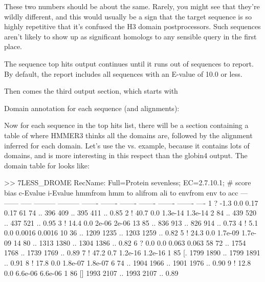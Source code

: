 These two numbers should be about the same. Rarely, you might see that
they're wildly different, and this would usually be a sign that the
target sequence is so highly repetitive that it's confused the H3
domain postprocessors. Such sequences aren't likely to show up as
significant homologs to any sensible query in the first place.

The sequence top hits output continues until it runs out of sequences
to report. By default, the report includes all sequences with an
E-value of 10.0 or less. 

Then comes the third output section, which starts with

\begin{sreoutput}
Domain annotation for each sequence (and alignments):
\end{sreoutput}

Now for each sequence in the top hits list, there will be a section 
containing a table of where HMMER3 thinks all the domains are,
followed by the alignment inferred for each domain. Let's use the
 vs.  example, because it contains lots
of domains, and is more interesting in this respect than the globin4
output.  The domain table for  looks like:

\begin{sreoutput}
>> 7LESS_DROME  RecName: Full=Protein sevenless;          EC=2.7.10.1;
   #    score  bias  c-Evalue  i-Evalue hmmfrom  hmm to    alifrom  ali to    envfrom  env to     acc
 ---   ------ ----- --------- --------- ------- -------    ------- -------    ------- -------    ----
   1 ?   -1.3   0.0      0.17      0.17      61      74 ..     396     409 ..     395     411 .. 0.85
   2 !   40.7   0.0   1.3e-14   1.3e-14       2      84 ..     439     520 ..     437     521 .. 0.95
   3 !   14.4   0.0     2e-06     2e-06      13      85 ..     836     913 ..     826     914 .. 0.73
   4 !    5.1   0.0    0.0016    0.0016      10      36 ..    1209    1235 ..    1203    1259 .. 0.82
   5 !   24.3   0.0   1.7e-09   1.7e-09      14      80 ..    1313    1380 ..    1304    1386 .. 0.82
   6 ?    0.0   0.0     0.063     0.063      58      72 ..    1754    1768 ..    1739    1769 .. 0.89
   7 !   47.2   0.7   1.2e-16   1.2e-16       1      85 [.    1799    1890 ..    1799    1891 .. 0.91
   8 !   17.8   0.0   1.8e-07   1.8e-07       6      74 ..    1904    1966 ..    1901    1976 .. 0.90
   9 !   12.8   0.0   6.6e-06   6.6e-06       1      86 []    1993    2107 ..    1993    2107 .. 0.89
\end{sreoutput}


